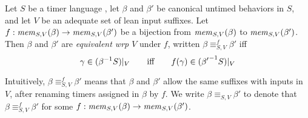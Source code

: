 \begin{definition}
  \label{def:approx-nerode}
Let $S$ be a timer language ,
let $\beta$ and $\beta'$ be canonical untimed behaviors in $S$,
and let  $V$ be an adequate set of lean input suffixes.
Let $f : \apprgetmemorable{S}{\beta}{V} \to \apprgetmemorable{S}{\beta'}{V}$
be a bijection
from $\apprgetmemorable{S}{\beta}{V}$ to $\apprgetmemorable{S}{\beta'}{V}$.
Then $\beta$ and $\beta'$ are \emph{equivalent wrp $V$} under $f$, written
$\beta \equiv_{S,V}^f \beta'$ iff
\[
\gamma \in \apprsuffixbehs{S}{\beta}{V}
\qquad \mbox{iff} \qquad
f(\gamma) \in \apprsuffixbehs{S}{\beta'}{V}
\]
\end{definition}
Intuitively, $\beta \equiv_{S,V}^f \beta'$ means that $\beta$ and $\beta'$
allow the same suffixes with inputs in $V$, after renaming
timers assigned in $\beta$ by $f$.
We write $\beta \equiv_{S,V} \beta'$ to denote that
$\beta \equiv_{S,V}^f \beta'$ for some
$f : \apprgetmemorable{S}{\beta}{V} \to \apprgetmemorable{S}{\beta'}{V}$.




